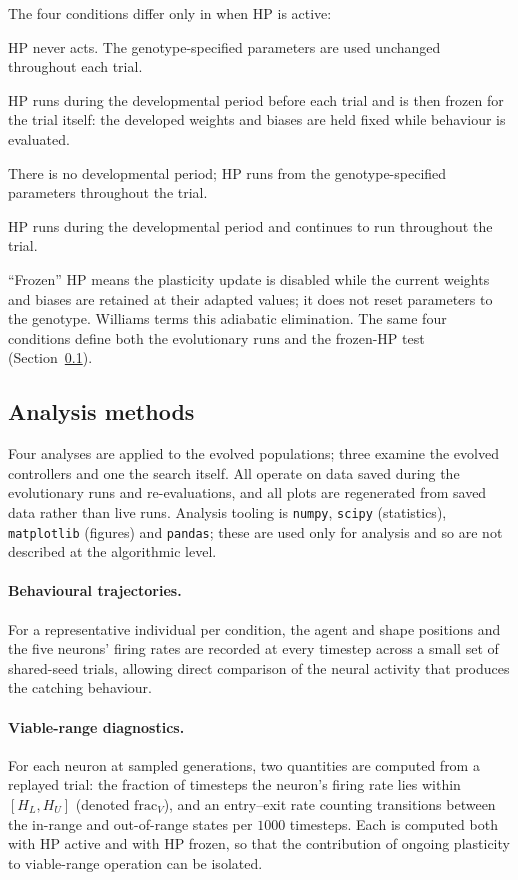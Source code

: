 The four conditions differ only in when HP is active:
%
\begin{description}[leftmargin=2em, itemsep=2pt]
  \item[No HP.] HP never acts. The genotype-specified parameters are used
    unchanged throughout each trial.
  \item[Dev only.] HP runs during the developmental period before each trial
    and is then frozen for the trial itself: the developed weights and biases
    are held fixed while behaviour is evaluated.
  \item[Behaviour only.] There is no developmental period; HP runs from the
    genotype-specified parameters throughout the trial.
  \item[Both.] HP runs during the developmental period and continues to run
    throughout the trial.
\end{description}
%
``Frozen'' HP means the plasticity update is disabled while the current weights
and biases are retained at their adapted values; it does not reset parameters to
the genotype. Williams terms this adiabatic elimination. The same four
conditions define both the evolutionary runs and the frozen-HP test
(Section~\ref{sec:methods:analysis}).

\subsection{Analysis methods}
\label{sec:methods:analysis}

Four analyses are applied to the evolved populations; three examine the evolved
controllers and one the search itself. All operate on data saved during the
evolutionary runs and re-evaluations, and all plots are regenerated from saved
data rather than live runs. Analysis tooling is \texttt{numpy},
\texttt{scipy} (statistics), \texttt{matplotlib} (figures) and \texttt{pandas};
these are used only for analysis and so are not described at the algorithmic
level.

\paragraph{Behavioural trajectories.}
For a representative individual per condition, the agent and shape positions and
the five neurons' firing rates are recorded at every timestep across a small set
of shared-seed trials, allowing direct comparison of the neural activity that
produces the catching behaviour.

\paragraph{Viable-range diagnostics.}
For each neuron at sampled generations, two quantities are computed from a
replayed trial: the fraction of timesteps the neuron's firing rate lies within
$[H_L, H_U]$ (denoted $\mathrm{frac}_V$), and an entry--exit rate counting
transitions between the in-range and out-of-range states per $1000$ timesteps.
Each is computed both with HP active and with HP frozen, so that the
contribution of ongoing plasticity to viable-range operation can be isolated.


